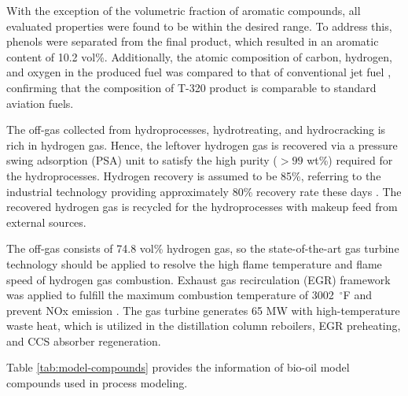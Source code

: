 \documentclass[11pt]{article}
\begin{document}
    With the exception of the volumetric fraction of aromatic compounds, all evaluated properties were found to be within the desired range. 
    To address this, phenols were separated from the final product, which resulted in an aromatic content of 10.2 vol\%.
    Additionally, the atomic composition of carbon, hydrogen, and oxygen in the produced fuel was compared to that of conventional jet fuel \cite{zhang2015production}, confirming that the composition of T-320 product is comparable to standard aviation fuels.
    
    The off-gas collected from hydroprocesses, hydrotreating, and hydrocracking is rich in hydrogen gas.
    Hence, the leftover hydrogen gas is recovered via a pressure swing adsorption (PSA) unit to satisfy the high purity ($> 99$ wt\%) required for the hydroprocesses.
    Hydrogen recovery is assumed to be 85\%, referring to the industrial technology providing approximately 80\% recovery rate these days \cite{mahler_hydroswing}.
    The recovered hydrogen gas is recycled for the hydroprocesses with makeup feed from external sources. 
    
    The off-gas consists of 74.8 vol\% hydrogen gas, so the state-of-the-art gas turbine technology should be applied to resolve the high flame temperature and flame speed of hydrogen gas combustion.
    Exhaust gas recirculation (EGR) framework was applied to fulfill the maximum combustion temperature of 3002~$^{\circ}$F and prevent NOx emission \cite{dennis2024literature}.
    The gas turbine generates 65 MW with high-temperature waste heat, which is utilized in the distillation column reboilers, EGR preheating, and CCS absorber regeneration. 

Table \ref{tab:model-compounds} provides the information of bio-oil model compounds used in process modeling. 
\end{document}
